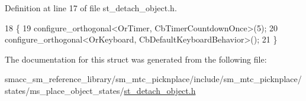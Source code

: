 Definition at line 17 of file st\+\_\+detach\+\_\+object.\+h.


\begin{DoxyCode}
18     \{
19         configure\_orthogonal<OrTimer,  CbTimerCountdownOnce>(5);   
20         configure\_orthogonal<OrKeyboard, CbDefaultKeyboardBehavior>();
21     \}
\end{DoxyCode}


The documentation for this struct was generated from the following file\+:\begin{DoxyCompactItemize}
\item 
smacc\+\_\+sm\+\_\+reference\+\_\+library/sm\+\_\+mtc\+\_\+picknplace/include/sm\+\_\+mtc\+\_\+picknplace/states/ms\+\_\+place\+\_\+object\+\_\+states/\hyperlink{st__detach__object_8h}{st\+\_\+detach\+\_\+object.\+h}\end{DoxyCompactItemize}
